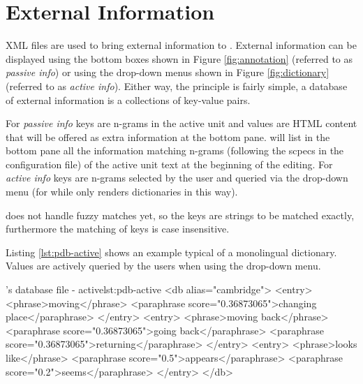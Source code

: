 \section{External Information}\label{sec:external}


XML files are used to bring external information to \PET{}.
External information can be displayed using the bottom boxes shown in Figure \ref{fig:annotation} (referred to as {\it passive info}) or using the drop-down menus shown in Figure \ref{fig:dictionary} (referred to as {\it active info}).
Either way, the principle is fairly simple, a database of external information is a collections of key-value pairs. 

For {\it passive info} keys are n-grams in the active unit and values are HTML content that will be offered as extra information at the bottom pane. \PET will list in the bottom pane all the information matching n-grams (following the scpecs in the configuration file) of the active unit text at the beginning of the editing.
For {\it active info} keys are n-grams selected by the user and queried via the drop-down menu (for while \PET only renders dictionaries in this way).

\PET does not handle fuzzy matches yet, so the keys are strings to be matched exactly, furthermore the matching of keys is case insensitive.

Listing \ref{lst:pdb-active} shows an example typical of a monolingual dictionary. Values are actively queried by the users when using the drop-down menu.

\begin{workflow-code}{\PET's database file - active}{lst:pdb-active}
<db alias="cambridge">
  <entry>
    <phrase>moving</phrase>
    <paraphrase score="0.36873065">changing place</paraphrase>
  </entry>
  <entry>
    <phrase>moving back</phrase>
    <paraphrase score="0.36873065">going back</paraphrase>
    <paraphrase score="0.36873065">returning</paraphrase>
  </entry>
  <entry>
    <phrase>looks like</phrase>
    <paraphrase score="0.5">appears</paraphrase>
    <paraphrase score="0.2">seems</paraphrase>
  </entry>
</db>
\end{workflow-code}


